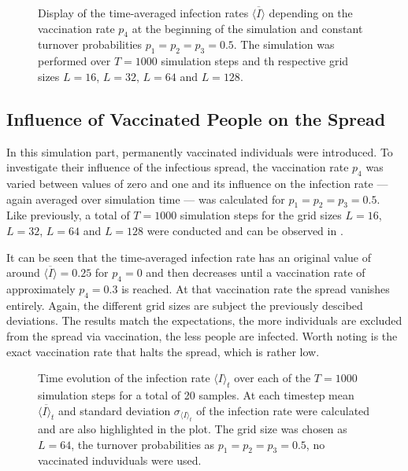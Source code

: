 \begin{figure}[ht]
    \centering
    \resizebox{\textwidth}{!}{}
    \caption{Display of the time-averaged infection rates $\overline{\langle I\rangle}$ depending on the vaccination rate $p_4$ at the beginning of the simulation and constant turnover probabilities
    $p_1=p_2=p_3=0.5$. The simulation was performed over $T=1000$ simulation steps and th respective grid sizes $L=16$, $L=32$, $L=64$ and $L=128$.}\label{fig:res_dis_avg_inf_over_p4}
\end{figure}


\subsection{Influence of Vaccinated People on the Spread}

In this simulation part, permanently vaccinated individuals \vaccinated{} were introduced. To investigate their influence of the infectious spread, the vaccination rate $p_4$ was varied between values of zero and one
and its influence on the infection rate --- again averaged over simulation time --- was calculated for $p_1=p_2=p_3=0.5$. Like previously, a total of $T=1000$ simulation steps for the grid sizes 
$L=16$, $L=32$, $L=64$ and $L=128$ were conducted and can be observed in . 

It can be seen that the time-averaged infection rate has an original value of around $\overline{\langle I\rangle}=0.25$ for $p_4=0$ and then decreases until a vaccination rate of approximately $p_4=0.3$ is reached.
At that vaccination rate the spread vanishes entirely. Again, the different grid sizes are subject the previously descibed deviations. 
The results match the expectations, the more individuals are excluded from the spread via vaccination, the less people are infected. 
Worth noting is the exact vaccination rate that halts the spread, which is rather low.

\begin{figure}[ht]
    \centering
    \resizebox{\textwidth}{!}{}
    \caption{Time evolution of the infection rate $\langle I\rangle_t$ over each of the $T=1000$ simulation steps for a total of 20 samples. At each timestep mean $\overline{\langle I\rangle_t}$
    and standard deviation $\sigma_{\langle I\rangle_t}$ of the infection rate were calculated and are also highlighted in the plot. The grid size was chosen as $L=64$, the turnover probabilities
    as $p_1=p_2=p_3=0.5$, no vaccinated induviduals were used.}\label{fig:res_dis_avg_inf_over_t}
\end{figure}


